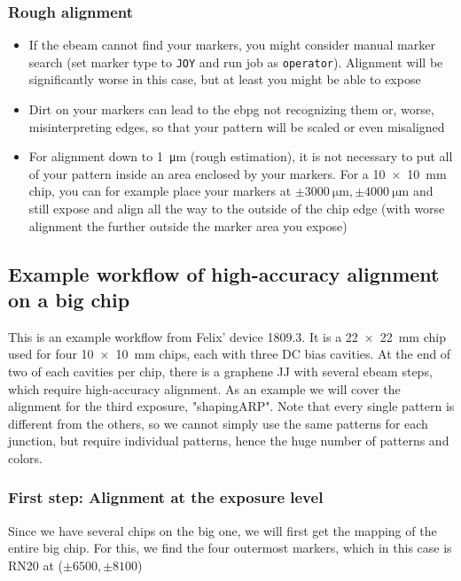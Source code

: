 \subsubsection{Rough alignment}
\begin{itemize}
	\item If the ebeam cannot find your markers, you might consider manual marker search (set marker type to \lstinline|JOY| and run job as \lstinline|operator|). Alignment will be significantly worse in this case, but at least you might be able to expose
	\item Dirt on your markers can lead to the ebpg not recognizing them or, worse, misinterpreting edges, so that your pattern will be scaled or even misaligned
	\item For alignment down to \SI{1}{\micro\meter} (rough estimation), it is not necessary to put all of your pattern inside an area enclosed by your markers. For a \SI{10x10}{\milli\meter} chip, you can for example place your markers at $\pm\SI{3000}{\micro\meter},\pm\SI{4000}{\micro\meter}$ and still expose and align all the way to the outside of the chip edge (with worse alignment the further outside the marker area you expose)
\end{itemize}

\subsection{Example workflow of high-accuracy alignment on a big chip}
This is an example workflow from Felix' device 1809.3. It is a \SI{22x22}{\milli\meter} chip used for four \SI{10x10}{\milli\meter} chips, each with three DC bias cavities. At the end of two of each cavities per chip, there is a graphene JJ with several ebeam steps, which require high-accuracy alignment. As an example we will cover the alignment for the third exposure, "shapingARP". Note that every single pattern is different from the others, so we cannot simply use the same patterns for each junction, but require individual patterns, hence the huge number of patterns and colors.

\subsubsection{First step: Alignment at the exposure level}
Since we have several chips on the big one, we will first get the mapping of the entire big chip. For this, we find the four outermost markers, which in this case is RN20 at ($\pm6500,\pm8100$)

